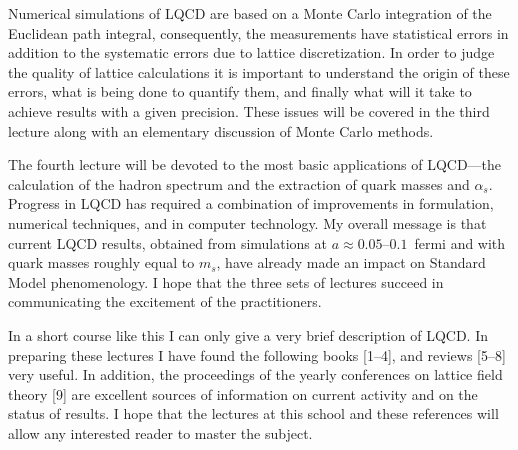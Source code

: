 Numerical simulations of LQCD are based on a Monte Carlo integration of
the Euclidean path integral, consequently, the measurements have
statistical errors in addition to the systematic errors due to lattice
discretization. In order to judge the quality of lattice calculations it is
important to understand the origin of these errors, what is being done to
quantify them, and finally what will it take to achieve results with a
given precision. These issues will be covered in the third lecture along
with an elementary discussion of Monte Carlo methods.

The fourth lecture will be devoted to the most basic applications of
LQCD---the calculation of the hadron spectrum and the extraction of quark
masses and $\alpha_s$. Progress in LQCD has required a combination of
improvements in formulation, numerical techniques, and in computer
technology. My overall message is that current LQCD results, obtained from
simulations at $a \approx 0.05$--$0.1$~fermi and with quark masses roughly
equal to $m_s$, have already made an impact on Standard Model
phenomenology. I hope that the three sets of lectures succeed in
communicating the excitement of the practitioners.

In a short course like this I can only give a very brief description of
LQCD. In preparing these lectures I have found the following books
[1--4], and reviews [5--8] very useful. In addition, the proceedings of
the yearly conferences on lattice field theory [9] are excellent sources
of information on current activity and on the status of results. I hope
that the lectures at this school and these references will allow any
interested reader to master the subject.
